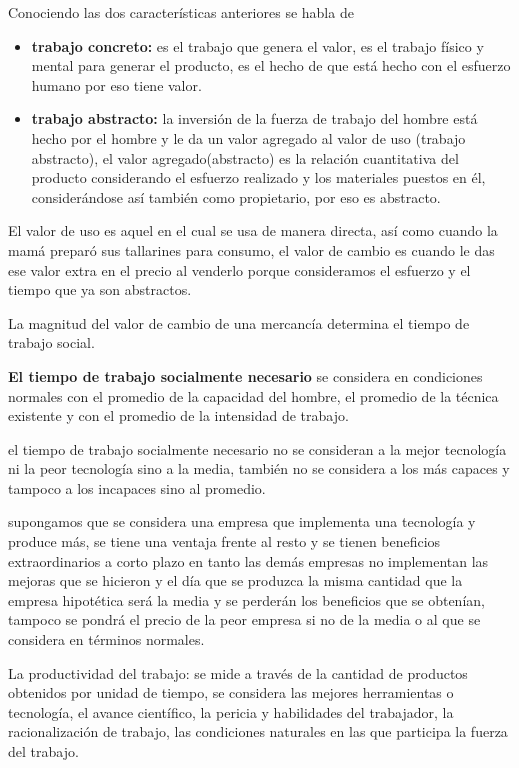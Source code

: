 \documentclass[
  a4paper,
]{article}
\begin{document}
Conociendo las dos características anteriores se habla de

\begin{itemize}
\item
  \textbf{trabajo concreto:} es el trabajo que genera el valor, es el
  trabajo físico y mental para generar el producto, es el hecho de que
  está hecho con el esfuerzo humano por eso tiene valor.
\item
  \textbf{trabajo abstracto:} la inversión de la fuerza de trabajo del
  hombre está hecho por el hombre y le da un valor agregado al valor de
  uso (trabajo abstracto), el valor agregado(abstracto) es la relación
  cuantitativa del producto considerando el esfuerzo realizado y los
  materiales puestos en él, considerándose así también como propietario,
  por eso es abstracto.
\end{itemize}

El valor de uso es aquel en el cual se usa de manera directa, así como
cuando la mamá preparó sus tallarines para consumo, el valor de cambio
es cuando le das ese valor extra en el precio al venderlo porque
consideramos el esfuerzo y el tiempo que ya son abstractos.

La magnitud del valor de cambio de una mercancía determina el tiempo de
trabajo social.

\textbf{El tiempo de trabajo socialmente necesario} se considera en
condiciones normales con el promedio de la capacidad del hombre, el
promedio de la técnica existente y con el promedio de la intensidad de
trabajo.

el tiempo de trabajo socialmente necesario no se consideran a la mejor
tecnología ni la peor tecnología sino a la media, también no se
considera a los más capaces y tampoco a los incapaces sino al promedio.

supongamos que se considera una empresa que implementa una tecnología y
produce más, se tiene una ventaja frente al resto y se tienen beneficios
extraordinarios a corto plazo en tanto las demás empresas no implementan
las mejoras que se hicieron y el día que se produzca la misma cantidad
que la empresa hipotética será la media y se perderán los beneficios que
se obtenían, tampoco se pondrá el precio de la peor empresa si no de la
media o al que se considera en términos normales.

La productividad del trabajo: se mide a través de la cantidad de
productos obtenidos por unidad de tiempo, se considera las mejores
herramientas o tecnología, el avance científico, la pericia y
habilidades del trabajador, la racionalización de trabajo, las
condiciones naturales en las que participa la fuerza del trabajo.
\end{document}
